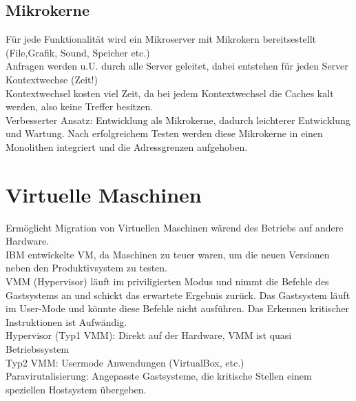 \documentclass[a4paper]{article}
\begin{document}
\subsection{Mikrokerne}
Für jede Funktionalität wird ein Mikroserver mit Mikrokern bereitsestellt (File,Grafik, Sound, Speicher etc.)\\
Anfragen werden u.U. durch alle Server geleitet, dabei entstehen für jeden Server Kontextwechse (Zeit!)\\
Kontextwechsel kosten viel Zeit, da bei jedem Kontextwechsel die Caches kalt werden, also keine Treffer besitzen.\\
Verbesserter Ansatz: Entwicklung als Mikrokerne, dadurch leichterer Entwicklung und Wartung. Nach erfolgreichem Testen werden diese Mikrokerne in einen Monolithen integriert und die Adressgrenzen aufgehoben.\\
\section{Virtuelle Maschinen}
Ermöglicht Migration von Virtuellen Maschinen wärend des Betriebs auf andere Hardware.\\
IBM entwickelte VM, da Maschinen zu teuer waren, um die neuen Versionen neben den Produktivsystem zu testen.\\
VMM (Hypervisor) läuft im priviligierten Modus und nimmt die Befehle des Gastsystems an und schickt das erwartete Ergebnis zurück. Das Gastsystem läuft im User-Mode und könnte diese Befehle nicht ausführen. Das Erkennen kritischer Instruktionen ist Aufwändig.\\
Hypervisor (Typ1 VMM): Direkt auf der Hardware, VMM ist quasi Betriebssystem\\
Typ2 VMM: Usermode Anwendungen (VirtualBox, etc.)\\
Paravirutalisierung: Angepasste Gastsysteme, die kritische Stellen einem speziellen Hostsystem übergeben.\\
\end{document}

